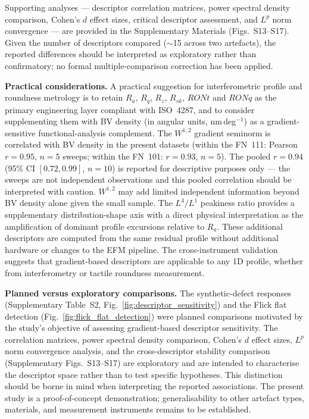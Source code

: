 \documentclass[review]{elsarticle}
\begin{document}
Supporting analyses — descriptor correlation matrices, power spectral density comparison, Cohen's $d$ effect sizes, critical descriptor assessment, and $L^p$ norm convergence — are provided in the Supplementary Materials (Figs.~S13--S17). Given the number of descriptors compared ($\sim$15 across two artefacts), the reported differences should be interpreted as exploratory rather than confirmatory; no formal multiple-comparison correction has been applied.

\textbf{Practical considerations.} A practical suggestion for interferometric profile and roundness metrology is to retain $R_a$, $R_q$, $R_z$, $R_{sk}$, $RONt$ and $RONq$ as the primary engineering layer compliant with ISO~4287, and to consider supplementing them with BV density (in angular units, nm\,deg$^{-1}$) as a gradient-sensitive functional-analysis complement. The $W^{1,2}$ gradient seminorm is correlated with BV density in the present datasets (within the FN~111: Pearson $r=0.95$, $n=5$ sweeps; within the FN~101: $r=0.93$, $n=5$). The pooled $r=0.94$ (95\% CI $[0.72,0.99]$, $n=10$) is reported for descriptive purposes only --- the sweeps are not independent observations and this pooled correlation should be interpreted with caution. $W^{1,2}$ may add limited independent information beyond BV density alone given the small sample. The $L^4/L^1$ peakiness ratio provides a supplementary distribution-shape axis with a direct physical interpretation as the amplification of dominant profile excursions relative to $R_a$. These additional descriptors are computed from the same residual profile without additional hardware or changes to the EFM pipeline. The cross-instrument validation suggests that gradient-based descriptors are applicable to any 1D profile, whether from interferometry or tactile roundness measurement.

\textbf{Planned versus exploratory comparisons.} The synthetic-defect responses (Supplementary Table~S2, Fig.~\ref{fig:descriptor_sensitivity}) and the Flick flat detection (Fig.~\ref{fig:flick_flat_detection}) were planned comparisons motivated by the study's objective of assessing gradient-based descriptor sensitivity. The correlation matrices, power spectral density comparison, Cohen's $d$ effect sizes, $L^p$ norm convergence analysis, and the cross-descriptor stability comparison (Supplementary Figs.~S13--S17) are exploratory and are intended to characterise the descriptor space rather than to test specific hypotheses. This distinction should be borne in mind when interpreting the reported associations. The present study is a proof-of-concept demonstration; generalisability to other artefact types, materials, and measurement instruments remains to be established.
\end{document}
